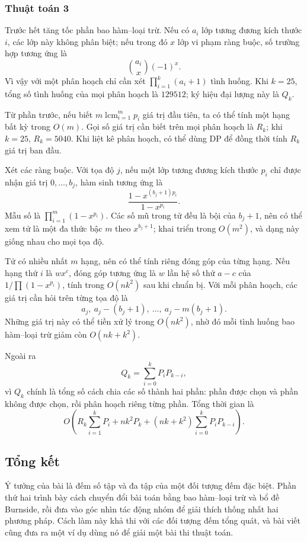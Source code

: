 \documentclass[11pt]{article}
\begin{document}
\subsubsection{Thuật toán 3}

Trước hết tăng tốc phần bao hàm--loại trừ. Nếu có \(a_i\) lớp tương đương kích
thước \(i\), các lớp này không phân biệt; nếu trong đó \(x\) lớp vi phạm ràng
buộc, số trường hợp tương ứng là
\[
  \binom{a_i}{x}(-1)^x.
\]
Vì vậy với một phân hoạch chỉ cần xét \(\prod_{i=1}^{k}(a_i+1)\) tình huống.
Khi \(k=25\), tổng số tình huống của mọi phân hoạch là \(129512\); ký hiệu đại
lượng này là \(Q_k\).

Từ phần trước, nếu biết \(m\operatorname{lcm}_{i=1}^{m}p_i\) giá trị đầu tiên,
ta có thể tính một hạng bất kỳ trong \(O(m)\). Gọi số giá trị cần biết trên
mọi phân hoạch là \(R_k\); khi \(k=25\), \(R_k=5040\). Khi liệt kê phân hoạch,
có thể dùng DP để đồng thời tính \(R_k\) giá trị ban đầu.

Xét các ràng buộc. Với tọa độ \(j\), nếu một lớp tương đương kích thước \(p_i\)
chỉ được nhận giá trị \(0,\ldots,b_j\), hàm sinh tương ứng là
\[
  \frac{1-x^{(b_j+1)p_i}}{1-x^{p_i}}.
\]
Mẫu số là \(\prod_{i=1}^{m}(1-x^{p_i})\). Các số mũ trong tử đều là bội của
\(b_j+1\), nên có thể xem tử là một đa thức bậc \(m\) theo \(x^{b_j+1}\); khai
triển trong \(O(m^2)\), và dạng này giống nhau cho mọi tọa độ.

Tử có nhiều nhất \(m\) hạng, nên có thể tính riêng đóng góp của từng hạng. Nếu
hạng thứ \(i\) là \(wx^c\), đóng góp tương ứng là \(w\) lần hệ số thứ \(a-c\)
của \(1/\prod(1-x^{p_i})\), tính trong \(O(nk^2)\) sau khi chuẩn bị. Với mỗi
phân hoạch, các giá trị cần hỏi trên từng tọa độ là
\[
  a_j,\ a_j-(b_j+1),\ \ldots,\ a_j-m(b_j+1).
\]
Những giá trị này có thể tiền xử lý trong \(O(nk^2)\), nhờ đó mỗi tình huống
bao hàm--loại trừ giảm còn \(O(nk+k^2)\).

Ngoài ra
\[
  Q_k=\sum_{i=0}^{k} P_iP_{k-i},
\]
vì \(Q_k\) chính là tổng số cách chia các số thành hai phần: phần được chọn và
phần không được chọn, rồi phân hoạch riêng từng phần. Tổng thời gian là
\[
  O\left(
    R_k\sum_{i=1}^{k}P_i
    +nk^2P_k
    +(nk+k^2)\sum_{i=0}^{k}P_iP_{k-i}
  \right).
\]

\subsection{Tổng kết}

Ý tưởng của bài là đếm số tập và đa tập của một đối tượng đếm đặc biệt. Phần
thứ hai trình bày cách chuyển đổi bài toán bằng bao hàm--loại trừ và bổ đề
Burnside, rồi đưa vào góc nhìn tác động nhóm để giải thích thống nhất hai
phương pháp. Cách làm này khả thi với các đối tượng đếm tổng quát, và bài viết
cũng đưa ra một ví dụ dùng nó để giải một bài thi thuật toán.
\end{document}
